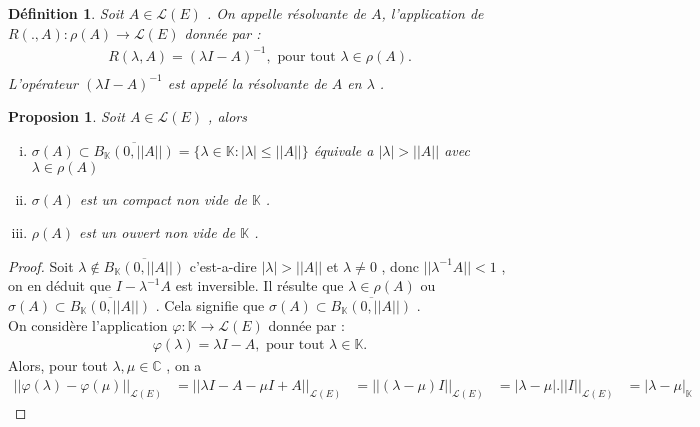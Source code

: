 \documentclass{report}
\newtheorem{Def}{Définition}[subsection]
\newtheorem{Prop}{Proposion}[subsection]
\begin{document}
{\begin{Def} Soit $A \in \mathscr{L}(E)$ . On appelle résolvante de $A$, l'application de $R(.,A) : \rho(A) \rightarrow \mathscr{L}(E)$ donnée par : 
					\begin{align*}
						 R(\lambda, A) = (\lambda I - A)^{-1} , \,\,\text{pour tout}\,\, \lambda \in \rho(A) .\\
					\end{align*}
	L'opérateur $(\lambda I - A)^{-1}$ est appelé la résolvante de $A$ en $\lambda$ .\\
\end{Def}

\begin{Prop} Soit  $A \in \mathscr{L}(E)$ , alors 
\begin{enumerate}[i)]
	\item      $\sigma(A) \subset \overline{B_{\mathbb{K}}(0,||A||)} = \{\lambda \in \mathbb{K} : |\lambda| \le ||A||\} $ équivale a $|\lambda| > ||A||$ avec $\lambda \in \rho(A)$ 
	\item     $\sigma(A)$ est un compact non vide de $\mathbb{K}$ .
	\item    $\rho(A)$ est un ouvert non vide de $\mathbb{K}$ .
\end{enumerate}
\end{Prop}
\begin{proof}
 Soit $\lambda \notin \overline{B_{\mathbb{K}}(0,||A||)}$ c'est-a-dire $|\lambda| > ||A||$ et $\lambda \neq 0$ , donc $||\lambda^{-1} A|| < 1$ , on en déduit que $I - \lambda^{-1} A$ est inversible. Il résulte que $\lambda \in \rho(A)$ ou $\sigma(A) \subset \overline{B_{\mathbb{K}}(0,||A||)}$ . Cela signifie que $\sigma(A) \subset \overline{B_{\mathbb{K}}(0,||A||)}$ . \\
 On considère l'application $\varphi : \mathbb{K} \rightarrow \mathscr{L}(E)$ donnée par : 
					\begin{align*}
				 \varphi(\lambda) = \lambda I - A , \,\,\text{pour tout}\,\, \lambda \in \mathbb{K} . 
					\end{align*}
Alors, pour tout $\lambda, \mu \in \mathbb{C}$ , on a 
					\begin{align*}
				 ||\varphi(\lambda) - \varphi(\mu)||_{\mathscr{L}(E)} &= ||\lambda I - A - \mu I + A||_{\mathscr{L}(E)} 
				 &= ||(\lambda - \mu)I||_{\mathscr{L}(E)} 
				 &= |\lambda - \mu|.||I||_{\mathscr{L}(E)} 
				 &= |\lambda - \mu|_{\mathbb{K}} 
					\end{align*}





\end{proof}}
\end{document}
